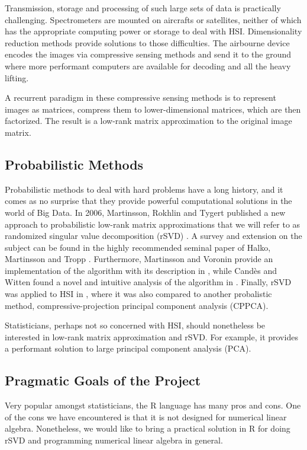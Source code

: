 \documentclass[a4paper,11pt]{amsart}
\begin{document}
Transmission, storage and processing of such large sets of data is practically challenging. Spectrometers are mounted on aircrafts or satellites, neither of which has the appropriate computing power or storage to deal with HSI. Dimensionality reduction methods provide solutions to those difficulties. The airbourne device encodes the images via compressive sensing methods and send it to the ground where more performant computers are available for decoding and all the heavy lifting. 

A recurrent paradigm in these compressive sensing methods is to represent images as matrices, compress them to lower-dimensional matrices, which are then factorized. The result is a low-rank matrix approximation to the original image matrix.

\subsection{Probabilistic Methods}
Probabilistic methods to deal with hard problems have a long history, and it comes as no surprise that they provide powerful computational solutions in the world of Big Data. In 2006, Martinsson, Rokhlin and Tygert published a new approach to probabilistic low-rank matrix approximations that we will refer to as randomized singular value decomposition (rSVD) \cite{MRT}. A survey and extension on the subject can be found in the highly recommended seminal paper of Halko, Martinsson and Tropp \cite{HMT}. Furthermore, Martinsson and Voronin provide an implementation of the algorithm with its description in \cite{MV}, while Cand\`es and Witten found a novel and intuitive analysis of the algorithm in \cite{CW}. Finally, rSVD was applied to HSI in \cite{EHPZZ}, where it was also compared to another probalistic method, compressive-projection principal component analysis (CPPCA).

 Statisticians, perhaps not so concerned with HSI, should nonetheless be interested in low-rank matrix approximation and rSVD. For example, it provides a performant solution to large principal component analysis (PCA).

\subsection{Pragmatic Goals of the Project}
Very popular amongst statisticians, the R language has many pros and cons. One of the cons we have encountered is that it is not designed for numerical linear algebra. Nonetheless, we would like to bring a practical solution in R for doing rSVD and programming numerical linear algebra in general.
\end{document}
